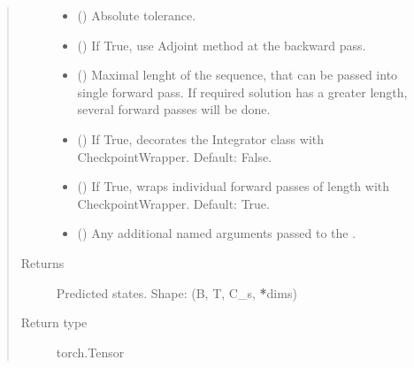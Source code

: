 \documentclass[letterpaper,10pt,english]{sphinxmanual}
\begin{document}
\begin{fulllineitems}
\begin{fulllineitems}
\begin{quote}
\begin{description}
\begin{itemize}
\item {} 
 () \textendash{} Absolute tolerance.

\item {} 
 () \textendash{} If True, use Adjoint method at the backward pass.

\item {} 
 () \textendash{} Maximal lenght of the sequence, that can be passed into single forward pass.
If required solution has a greater length, several forward passes will be done.

\item {} 
 () \textendash{} If True, decorates the Integrator class with CheckpointWrapper. Default: False.

\item {} 
 () \textendash{} If True, wraps individual forward passes of length  with CheckpointWrapper. Default: True.

\item {} 
 () \textendash{} Any additional named arguments passed to the .

\end{itemize}

\item[{Returns}] \leavevmode
{} \textendash{} Predicted states. Shape: (B, T, C\_s, {\color{red}\bfseries{}*}dims)

\item[{Return type}] \leavevmode
torch.Tensor


\end{description}
\end{quote}
\end{fulllineitems}
\end{fulllineitems}
\end{document}
